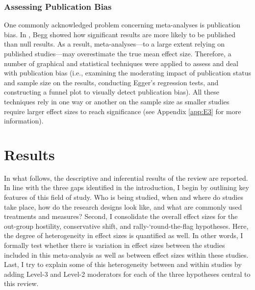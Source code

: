 \subsubsection{Assessing Publication Bias}
One commonly acknowledged problem concerning meta-analyses is publication bias. In \citeyear{Begg1994}, Begg showed how significant results are more likely to be published than null results. As a result, meta-analyses—to a large extent relying on published studies—may overestimate the true mean effect size. Therefore, a number of graphical and statistical techniques were applied to assess and deal with publication bias (i.e., examining the moderating impact of publication status and sample size on the results, conducting Egger's regression tests, and constructing a funnel plot to visually detect publication bias). All these techniques rely in one way or another on the sample size as smaller studies require larger effect sizes to reach significance (see Appendix \ref{app:E3} for more information). 
\newpage




\section{Results}
\label{sec:54}
In what follows, the descriptive and inferential results of the review are reported. In line with the three gaps identified in the introduction, I begin by outlining key features of this field of study. Who is being studied, when and where do studies take place, how do the research designs look like, and what are commonly used treatments and measures? Second, I consolidate the overall effect sizes for the out-group hostility, conservative shift, and rally-‘round-the-flag hypotheses. Here, the degree of heterogeneity in effect sizes is quantified as well. In other words, I formally test whether there is variation in effect sizes between the studies included in this meta-analysis as well as between effect sizes within these studies. Last, I try to explain some of this heterogeneity between and within studies by adding Level-3 and Level-2 moderators for each of the three hypotheses central to this review.


